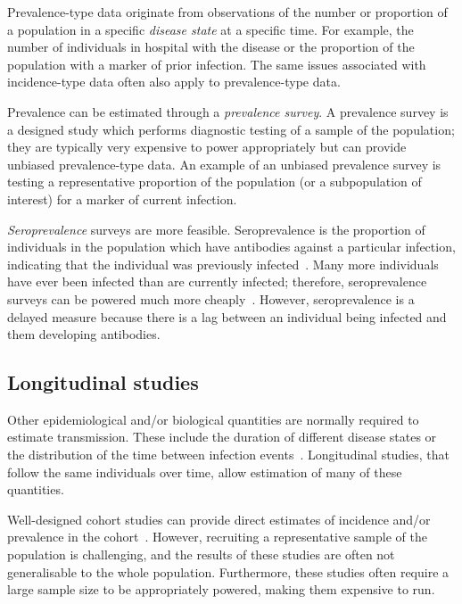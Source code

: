\documentclass[thesis.tex]{subfiles}
\begin{document}
Prevalence-type data originate from observations of the number or proportion of a population in a specific \emph{disease state} at a specific time.
For example, the number of individuals in hospital with the disease or the proportion of the population with a marker of prior infection.
The same issues associated with incidence-type data often also apply to prevalence-type data.

Prevalence can be estimated through a \emph{prevalence survey}.
A prevalence survey is a designed study which performs diagnostic testing of a sample of the population; they are typically very expensive to power appropriately but can provide unbiased prevalence-type data.
An example of an unbiased prevalence survey is testing a representative proportion of the population (or a subpopulation of interest) for a marker of current infection.

\emph{Seroprevalence} surveys are more feasible.
Seroprevalence is the proportion of individuals in the population which have antibodies against a particular infection, indicating that the individual was previously infected~\autocite{cdcSeroprevalence}.
Many more individuals have ever been infected than are currently infected; therefore, seroprevalence surveys can be powered much more cheaply~\autocite{wuSeroprevSimulation}.
However, seroprevalence is a delayed measure because there is a lag between an individual being infected and them developing antibodies.

\subsection{Longitudinal studies}

Other epidemiological and/or biological quantities are normally required to estimate transmission.
These include the duration of different disease states or the distribution of the time between infection events~\autocite{wallingaGI,dankwaStructural}.
Longitudinal studies, that follow the same individuals over time, allow estimation of many of these quantities.

Well-designed cohort studies can provide direct estimates of incidence and/or prevalence in the cohort~\autocite[chapter 7]{lashModern}.
However, recruiting a representative sample of the population is challenging, and the results of these studies are often not generalisable to the whole population.
Furthermore, these studies often require a large sample size to be appropriately powered, making them expensive to run.
\end{document}
